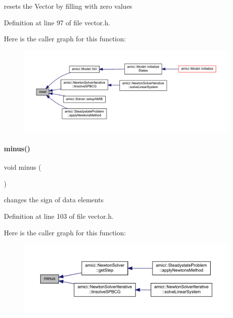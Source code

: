 resets the Vector by filling with zero values 

Definition at line 97 of file vector.\+h.

Here is the caller graph for this function\+:
\nopagebreak
\begin{figure}[H]
\begin{center}
\leavevmode
\includegraphics[width=350pt]{classamici_1_1_ami_vector_ad20897c5c8bd47f5d4005989bead0e55_icgraph}
\end{center}
\end{figure}
\mbox{\label{classamici_1_1_ami_vector_a19ad39a609bfc430ed6f7992e841b024}} 
\paragraph{\texorpdfstring{minus()}{minus()}}
{\footnotesize\ttfamily void minus (\begin{DoxyParamCaption}{ }\end{DoxyParamCaption})}

changes the sign of data elements 

Definition at line 103 of file vector.\+h.

Here is the caller graph for this function\+:
\nopagebreak
\begin{figure}[H]
\begin{center}
\leavevmode
\includegraphics[width=350pt]{classamici_1_1_ami_vector_a19ad39a609bfc430ed6f7992e841b024_icgraph}
\end{center}
\end{figure}
\mbox{\label{classamici_1_1_ami_vector_a11418c829db7c2891d63491cf12d29b4}} 
